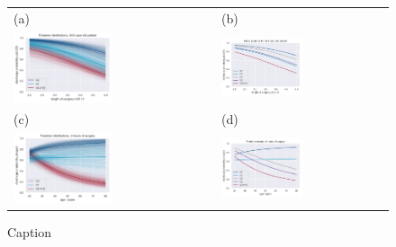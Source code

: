\begin{figure}
    \centering
    \begin{tabular}{ll}
(a)  & (b) \\
\includegraphics[width=0.5\textwidth]{images/DS19fk1_c0__p_LoS__model_B__traces_V0_V4-12__age_mean.png}&
\includegraphics[width=0.5\textwidth]{images/DS19fk1_c0__p_LoS__model_B__mean__age_mean.pdf}\\
(c) & (d) \\
\includegraphics[width=0.5\textwidth]{images/DS19fk1_c0__p_age__model_B__traces__LoS_4h.png}&
\includegraphics[width=0.5\textwidth]{images/DS19fk1_c0__p_age__model_B__mean__LoS_4h.pdf}\\
\end{tabular}
    \caption{Caption}
    \label{fig:posterior}
\end{figure}


